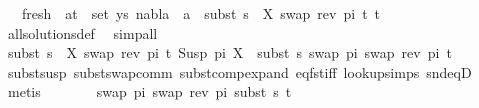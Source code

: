 \begin{isabellebody}
\ \ \ fresh{\isacharcolon}{\kern0pt}\ {\isachardoublequoteopen}{\isasymforall}\ {\isacharparenleft}{\kern0pt}a{\isacharcomma}{\kern0pt}t{\isacharparenright}{\kern0pt}\ {\isasymin}\ set\ ys{\isachardot}{\kern0pt}\ nabla{}\ {\isasymturnstile}\ a\ {\isasymsharp}\ subst\ {\isacharparenleft}{\kern0pt}s{}\ {\isasymbullet}\ {\isacharbrackleft}{\kern0pt}{\isacharparenleft}{\kern0pt}X{\isacharcomma}{\kern0pt}\ swap\ {\isacharparenleft}{\kern0pt}rev\ pi{\isacharparenright}{\kern0pt}\ t{\isacharprime}{\kern0pt}{\isacharparenright}{\kern0pt}{\isacharbrackright}{\kern0pt}{\isacharparenright}{\kern0pt}\ t{\isachardoublequoteclose}\isanewline
\ \ \ \ \isamarkupfalse%
\ all{\isacharunderscore}{\kern0pt}solutions{\isacharunderscore}{\kern0pt}def\ \isamarkupfalse%
\ simp{\isacharunderscore}{\kern0pt}all\isanewline
\isanewline
\ \ \isamarkupfalse%
\ {\isachardoublequoteopen}subst\ {\isacharparenleft}{\kern0pt}s{}\ {\isasymbullet}\ {\isacharbrackleft}{\kern0pt}{\isacharparenleft}{\kern0pt}X{\isacharcomma}{\kern0pt}\ swap\ {\isacharparenleft}{\kern0pt}rev\ pi{\isacharparenright}{\kern0pt}\ t{\isacharprime}{\kern0pt}{\isacharparenright}{\kern0pt}{\isacharbrackright}{\kern0pt}{\isacharparenright}{\kern0pt}\ {\isacharparenleft}{\kern0pt}Susp\ pi\ X{\isacharparenright}{\kern0pt}\ {\isacharequal}{\kern0pt}\ subst\ s{}\ {\isacharparenleft}{\kern0pt}swap\ pi\ {\isacharparenleft}{\kern0pt}swap\ {\isacharparenleft}{\kern0pt}rev\ pi{\isacharparenright}{\kern0pt}\ t{\isacharprime}{\kern0pt}{\isacharparenright}{\kern0pt}{\isacharparenright}{\kern0pt}{\isachardoublequoteclose}\isanewline
\ \ \ \ \isamarkupfalse%
\ subst{\isacharunderscore}{\kern0pt}susp\ subst{\isacharunderscore}{\kern0pt}swap{\isacharunderscore}{\kern0pt}comm\ subst{\isacharunderscore}{\kern0pt}comp{\isacharunderscore}{\kern0pt}expand\ eq{\isacharunderscore}{\kern0pt}fst{\isacharunderscore}{\kern0pt}iff\ look{\isacharunderscore}{\kern0pt}up{\isachardot}{\kern0pt}simps{\isacharparenleft}{\kern0pt}{}{\isacharparenright}{\kern0pt}\ snd{\isacharunderscore}{\kern0pt}eqD\ \isamarkupfalse%
\ metis\isanewline
\ \ \isamarkupfalse%
\ \isamarkupfalse%
\ {\isachardoublequoteopen}{\isachardot}{\kern0pt}{\isachardot}{\kern0pt}{\isachardot}{\kern0pt}\ {\isacharequal}{\kern0pt}\ swap\ pi\ {\isacharparenleft}{\kern0pt}swap\ {\isacharparenleft}{\kern0pt}rev\ pi{\isacharparenright}{\kern0pt}\ {\isacharparenleft}{\kern0pt}subst\ s{}\ t{\isacharprime}{\kern0pt}{\isacharparenright}{\kern0pt}{\isacharparenright}{\kern0pt}{\isachardoublequoteclose}\isanewline

\end{isabellebody}
